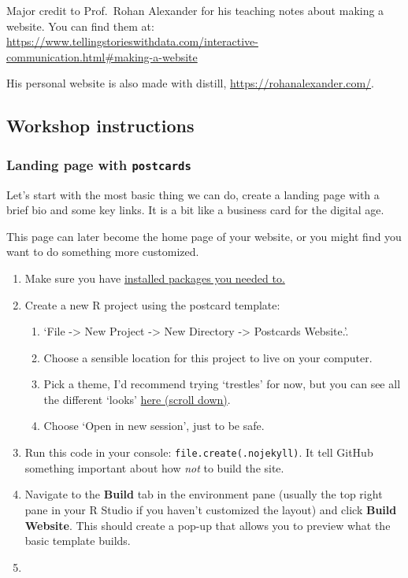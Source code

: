 \documentclass[
]{article}
\providecommand{\tightlist}{%
  \setlength{\itemsep}{0pt}\setlength{\parskip}{0pt}}
\begin{document}
Major credit to Prof.~Rohan Alexander for his teaching notes about making a website. You can find them at: \url{https://www.tellingstorieswithdata.com/interactive-communication.html\#making-a-website}

His personal website is also made with distill, \url{https://rohanalexander.com/}.

\hypertarget{workshop-instructions}{%
\subsection{Workshop instructions}\label{workshop-instructions}}

\hypertarget{landing-page-with-postcards}{%
\subsubsection{\texorpdfstring{Landing page with \texttt{postcards}}{Landing page with postcards}}\label{landing-page-with-postcards}}

Let's start with the most basic thing we can do, create a landing page with a brief bio and some key links. It is a bit like a business card for the digital age.

This page can later become the home page of your website, or you might find you want to do something more customized.

\begin{enumerate}
\def\labelenumi{\arabic{enumi}.}
\item
  Make sure you have \protect\hyperlink{s1pre}{installed packages you needed to.}
\item
  Create a new R project using the postcard template:

  \begin{enumerate}
  \def\labelenumii{\alph{enumii}.}
  \tightlist
  \item
    `File -\textgreater{} New Project -\textgreater{} New Directory -\textgreater{} Postcards Website.'.
  \item
    Choose a sensible location for this project to live on your computer.
  \item
    Pick a theme, I'd recommend trying `trestles' for now, but you can see all the different `looks' \href{https://github.com/seankross/postcards}{here (scroll down)}.
  \item
    Choose `Open in new session', just to be safe.
  \end{enumerate}
\item
  Run this code in your console: \texttt{file.create(\textquotesingle{}.nojekyll\textquotesingle{})}. It tell GitHub something important about how \emph{not} to build the site.
\item
  Navigate to the \textbf{Build} tab in the environment pane (usually the top right pane in your R Studio if you haven't customized the layout) and click \textbf{Build Website}. This should create a pop-up that allows you to preview what the basic template builds.
\item
\end{enumerate}
\end{document}
